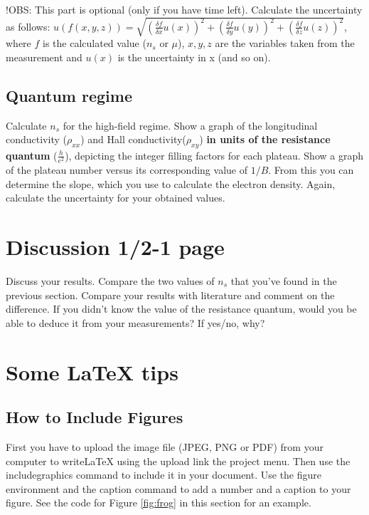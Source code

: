 \documentclass[a4paper]{article}
\begin{document}
!OBS: This part is optional (only if you have time left).
Calculate the uncertainty as follows: \newline $u(f(x, y, z)) = \sqrt{(\frac{\delta f}{\delta{x}} u(x))^{2} + (\frac{\delta f}{\delta{y}} u(y))^{2} + (\frac{\delta f}{\delta{z}} u(z))^{2}}$, where $f$ is the calculated value ($n_{s}$ or $\mu$), $x, y, z$ are the variables taken from the measurement and $u(x)$ is the uncertainty in x (and so on).

\subsection{Quantum regime}
Calculate $n_{s}$ for the high-field regime.
Show a graph of the longitudinal conductivity ($\rho_{xx}$) and Hall conductivity($\rho_{xy}$) \textbf{in units of the resistance quantum} ($\frac{h}{e^{2}}$), depicting the integer filling factors for each plateau.
Show a graph of the plateau number versus its corresponding value of $1/B$. From this you can determine the slope, which you use to calculate the electron density.
Again, calculate the uncertainty for your obtained values.

\section{Discussion 1/2-1 page}
Discuss your results. Compare the two values of $n_{s}$ that you've found in the previous section. Compare your results with literature and comment on the difference. If you didn't know the value of the resistance quantum, would you be able to deduce it from your measurements? If yes/no, why?

\newpage
\section{Some LaTeX tips}
\label{sec:latex}
\subsection{How to Include Figures}

First you have to upload the image file (JPEG, PNG or PDF) from your computer to writeLaTeX using the upload link the project menu. Then use the includegraphics command to include it in your document. Use the figure environment and the caption command to add a number and a caption to your figure. See the code for Figure \ref{fig:frog} in this section for an example.
\end{document}
